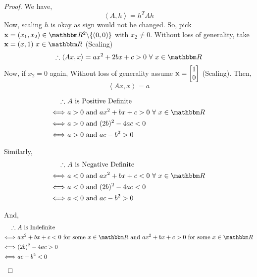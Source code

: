 \documentclass[Analysis-3]{subfiles}
\begin{document}
\begin{proof}
    We have, \[ \left\langle A, h \right\rangle = h^TAh \]
    Now, scaling $h$ is okay as sign would not be changed. So, pick ${\bf x} = (x_1, x_2) \in \R^2 \backslash \{(0,0)\} $ with $x_2 \neq 0$.
    Without loss of generality, take ${\bf x} = (x,1) \ x \in \R$ (Scaling) \\
    \[ \therefore \left\langle Ax, x \right\rangle = ax^2 + 2bx + c > 0 \ \forall\ x \in \R \]
    Now, if $x_2 = 0$ again, Without loss of generality assume ${\bf x} = \begin{bmatrix}
            1 \\
            0
        \end{bmatrix}$ (Scaling). Then, \[ \left\langle Ax, x \right\rangle = a \]

    \begin{align*}
        \therefore          & \ A \text{ is Positive Definite}                         \\
        \Longleftrightarrow & \ a > 0 \text{ and } ax^2 + bx+c > 0 \ \forall\ x \in \R \\
        \Longleftrightarrow & \ a > 0 \text{ and } (2b)^2 - 4ac < 0                    \\
        \Longleftrightarrow & \ a > 0 \text{ and } ac - b^2 > 0
    \end{align*}

    Similarly,
    \begin{align*}
        \therefore          & \ A \text{ is Negative Definite}                         \\
        \Longleftrightarrow & \ a < 0 \text{ and } ax^2 + bx+c < 0 \ \forall\ x \in \R \\
        \Longleftrightarrow & \ a < 0 \text{ and } (2b)^2 - 4ac < 0                    \\
        \Longleftrightarrow & \ a < 0 \text{ and } ac - b^2 > 0
    \end{align*}

    And,
    \begin{align*}
        \therefore          & \ A \text{ is Indefinite}                                                                              \\
        \Longleftrightarrow & \ ax^2 + bx+c < 0 \ \text{for some } x \in \R \text{ and } ax^2 + bx+c > 0 \ \text{for some } x \in \R \\
        \Longleftrightarrow & \ (2b)^2 - 4ac > 0                                                                                     \\
        \Longleftrightarrow & \ ac - b^2 < 0
    \end{align*}
\end{proof}
\end{document}
